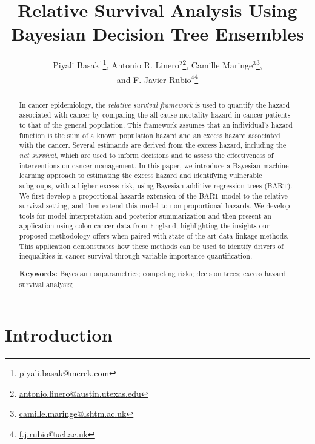 \documentclass[12pt]{article}
\author{Piyali Basak$^{1}$\thanks{\href{mailto:piyali.basak@merck.com}{piyali.basak@merck.com}}, 
Antonio R. Linero$^{2}$\thanks{\href{mailto:antonio.linero@austin.utexas.edu}{antonio.linero@austin.utexas.edu}},  
Camille Maringe$^{3}$\thanks{\href{mailto:camille.maringe@lshtm.ac.uk}{camille.maringe@lshtm.ac.uk}}, \\ and
F. Javier Rubio$^{4}$\thanks{\href{mailto:f.j.rubio@ucl.ac.uk}{f.j.rubio@ucl.ac.uk}}}
\begin{document}
\title{Relative Survival Analysis Using \\Bayesian Decision Tree Ensembles}
\date{}
\maketitle

\begin{abstract}
  In cancer epidemiology, the \emph{relative survival framework} is used to
  quantify the hazard associated with cancer by comparing the all-cause
  mortality hazard in cancer patients to that of the general population. This
  framework assumes that an individual's hazard function is the sum of a known
  population hazard and an excess hazard associated with the cancer. Several
  estimands are derived from the excess hazard, including the \emph{net
    survival}, which are used to inform decisions and to assess the
  effectiveness of interventions on cancer management. In this paper, we
  introduce a Bayesian machine learning approach to estimating the excess hazard
  and identifying vulnerable subgroups, with a higher excess risk, using
  Bayesian additive regression trees (BART). We first develop a proportional
  hazards extension of the BART model to the relative survival setting, and then
  extend this model to non-proportional hazards. We develop tools for model
  interpretation and posterior summarization and then present an application
  using colon cancer data from England, highlighting the insights our proposed
  methodology offers when paired with state-of-the-art data linkage methods.
  This application demonstrates how these methods can be used to identify
  drivers of inequalities in cancer survival through variable importance
  quantification.

  \vspace{1em}
  \noindent \textbf{Keywords:} 
  Bayesian nonparametrics;
  competing risks;
  decision trees;
  excess hazard;
  survival analysis;
\end{abstract}

\doublespacing


\section{Introduction}\label{sec:intro}
\end{document}
